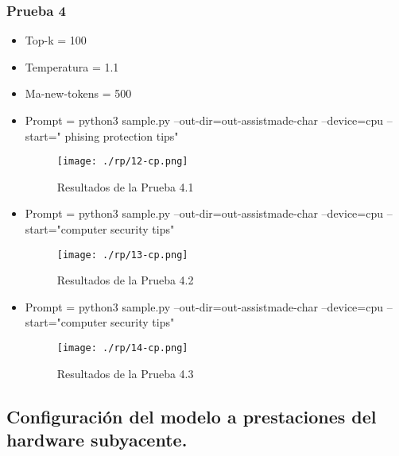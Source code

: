 \subsubsection{ Prueba 4}\label{section:Adaptación de modelo nanoGPT}
    \begin{itemize}
        \item   Top-k = 100
        \item   Temperatura = 1.1
        \item   Ma-new-tokens = 500
            \item   Prompt = python3 sample.py --out-dir=out-assistmade-char --device=cpu --start=" phising protection tips"
            \begin{figure}[H]
              \centering %
                  \texttt{[image: ./rp/12-cp.png]} 
              \caption{Resultados de la Prueba 4.1\cite{}}
            \label{figure:Resultado 1}  %
            \end{figure}
            \item   Prompt = python3 sample.py --out-dir=out-assistmade-char --device=cpu --start="computer security tips"
            \begin{figure}[H]
              \centering %
                  \texttt{[image: ./rp/13-cp.png]} 
              \caption{Resultados de la Prueba 4.2\cite{}}
            \label{figure:Resultado 1}  %
            \end{figure}
            \item   Prompt = python3 sample.py --out-dir=out-assistmade-char --device=cpu --start="computer security tips"
            \begin{figure}[H]
              \centering %
                  \texttt{[image: ./rp/14-cp.png]} 
              \caption{Resultados de la Prueba 4.3\cite{}}
            \label{figure:Resultado 1}  %
            \end{figure}
    \end{itemize}
\subsection{Configuración del modelo a prestaciones del hardware subyacente.}\label{section:Adaptación de modelo nanoGPT}

